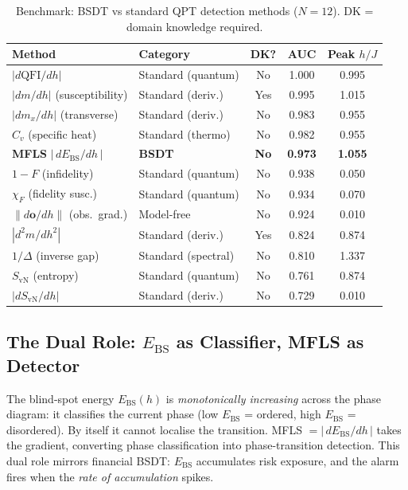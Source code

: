 \documentclass[11pt,a4paper]{article}
\newcommand{\Ebs}{E_{\mathrm{BS}}}
\begin{document}
\begin{table}[H]
\centering
\caption{Benchmark: BSDT vs standard QPT detection methods ($N=12$).
  DK = domain knowledge required.}
\label{tab:qpt_bench}
\small
\begin{tabular}{@{}llccc@{}}
\toprule
\textbf{Method} & \textbf{Category} & \textbf{DK?} &
\textbf{AUC} & \textbf{Peak $h/J$} \\
\midrule
$|d\mathrm{QFI}/dh|$ & Standard (quantum) & No & 1.000 & 0.995 \\
$|dm/dh|$ (susceptibility) & Standard (deriv.) & Yes & 0.995 & 1.015 \\
$|dm_x/dh|$ (transverse) & Standard (deriv.) & No & 0.983 & 0.955 \\
$C_v$ (specific heat) & Standard (thermo) & No & 0.982 & 0.955 \\
\textbf{MFLS} $|\,d\Ebs/dh\,|$ & \textbf{BSDT} & \textbf{No} & \textbf{0.973} & \textbf{1.055} \\
$1-F$ (infidelity) & Standard (quantum) & No & 0.938 & 0.050 \\
$\chi_F$ (fidelity susc.) & Standard (quantum) & No & 0.934 & 0.070 \\
$\|d\mathbf{o}/dh\|$ (obs.\ grad.) & Model-free & No & 0.924 & 0.010 \\
$|d^2 m/dh^2|$ & Standard (deriv.) & Yes & 0.824 & 0.874 \\
$1/\Delta$ (inverse gap) & Standard (spectral) & No & 0.810 & 1.337 \\
$S_{\mathrm{vN}}$ (entropy) & Standard (quantum) & No & 0.761 & 0.874 \\
$|dS_{\mathrm{vN}}/dh|$ & Standard (deriv.) & No & 0.729 & 0.010 \\
\bottomrule
\end{tabular}
\end{table}

\subsection{The Dual Role: $\Ebs$ as Classifier, MFLS as Detector}
The blind-spot energy $\Ebs(h)$ is \emph{monotonically increasing}
across the phase diagram: it classifies the current phase (low $\Ebs$ =
ordered, high $\Ebs$ = disordered).  By itself it cannot localise the
transition.  MFLS $ = |\,d\Ebs/dh\,|$ takes the gradient, converting
phase classification into phase-transition detection.  This dual role
mirrors financial BSDT: $\Ebs$ accumulates risk exposure, and the alarm
fires when the \emph{rate of accumulation} spikes.
\end{document}

